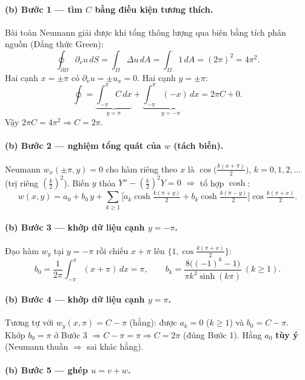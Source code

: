 \paragraph{(b) Bước 1 --- tìm $C$ bằng điều kiện tương thích.}\leavevmode

Bài toàn Neumann giải được khi tổng thông lượng qua biên bằng tích phân nguồn (Đẳng thức Green):
\[
  \oint_{\partial\Omega}\partial_\nu u\,dS=\int_\Omega \Delta u\,dA=\int_\Omega 1\,dA=(2\pi)^2=4\pi^2.
\]
Hai cạnh $x=\pm\pi$ có $\partial_\nu u=\pm u_x=0$. Hai cạnh $y=\pm\pi$:
\[
  \oint=\underbrace{\int_{-\pi}^{\pi}\!\! C\,dx}_{y=\pi}+\underbrace{\int_{-\pi}^{\pi}\!\!(-x)\,dx}_{y=-\pi}=2\pi C+0 .
\]
Vậy $2\pi C=4\pi^2\Rightarrow \boxed{C=2\pi}$.

\paragraph{(b) Bước 2 --- nghiệm tổng quát của $w$ (tách biến).}\leavevmode

Neumann $w_x(\pm\pi,y)=0$ cho hàm riêng theo $x$ là $\cos\!\big(\tfrac{k(x+\pi)}{2}\big)$, $k=0,1,2,\dots$ (trị riêng $(\tfrac k2)^2$). Biến $y$ thỏa $Y''-(\tfrac k2)^2Y=0$ $\Rightarrow$ tổ hợp $\cosh$:
\[
  w(x,y)=a_0+b_0\,y+\sum_{k\ge1}\Big[a_k\cosh\tfrac{k(\pi+y)}{2}+b_k\cosh\tfrac{k(\pi-y)}{2}\Big]\cos\tfrac{k(\pi+x)}{2}.
\]

\paragraph{(b) Bước 3 --- khớp dữ liệu cạnh $y=-\pi$.}
Đạo hàm $w_y$ tại $y=-\pi$ rồi chiếu $x+\pi$ lên $\{1,\cos\tfrac{k(\pi+x)}{2}\}$:
\[
  b_0=\frac{1}{2\pi}\int_{-\pi}^{\pi}(x+\pi)\,dx=\pi,\qquad
  b_k=\frac{8\big((-1)^k-1\big)}{\pi k^3\sinh(k\pi)}\ (k\ge1).
\]

\paragraph{(b) Bước 4 --- khớp dữ liệu cạnh $y=\pi$.}
Tương tự với $w_y(x,\pi)=C-\pi$ (hằng): được $a_k=0$ ($k\ge1$) và $b_0=C-\pi$. Khớp $b_0=\pi$ ở Bước 3 $\Rightarrow C-\pi=\pi\Rightarrow C=2\pi$ (đúng Bước 1). Hằng $a_0$ \textbf{tùy ý} (Neumann thuần $\Rightarrow$ sai khác hằng).

\paragraph{(b) Bước 5 --- ghép $u=v+w$.}\leavevmode

